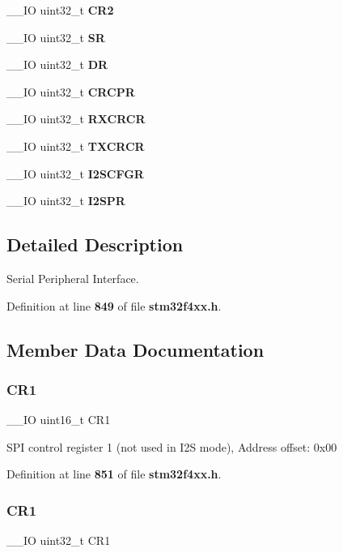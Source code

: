 \begin{DoxyCompactItemize}
\item 
\+\_\+\+\_\+\+IO uint32\+\_\+t \textbf{ C\+R2}
\item 
\+\_\+\+\_\+\+IO uint32\+\_\+t \textbf{ SR}
\item 
\+\_\+\+\_\+\+IO uint32\+\_\+t \textbf{ DR}
\item 
\+\_\+\+\_\+\+IO uint32\+\_\+t \textbf{ C\+R\+C\+PR}
\item 
\+\_\+\+\_\+\+IO uint32\+\_\+t \textbf{ R\+X\+C\+R\+CR}
\item 
\+\_\+\+\_\+\+IO uint32\+\_\+t \textbf{ T\+X\+C\+R\+CR}
\item 
\+\_\+\+\_\+\+IO uint32\+\_\+t \textbf{ I2\+S\+C\+F\+GR}
\item 
\+\_\+\+\_\+\+IO uint32\+\_\+t \textbf{ I2\+S\+PR}
\end{DoxyCompactItemize}


\subsection{Detailed Description}
Serial Peripheral Interface. 

Definition at line \textbf{ 849} of file \textbf{ stm32f4xx.\+h}.



\subsection{Member Data Documentation}
\mbox{\label{structSPI__TypeDef_a61400ce239355b62aa25c95fcc18a5e1}} 
\subsubsection{C\+R1\hspace{0.1cm}{\footnotesize\ttfamily [1/2]}}
{\footnotesize\ttfamily \+\_\+\+\_\+\+IO uint16\+\_\+t C\+R1}

S\+PI control register 1 (not used in I2S mode), Address offset\+: 0x00 

Definition at line \textbf{ 851} of file \textbf{ stm32f4xx.\+h}.

\mbox{\label{structSPI__TypeDef_ab0ec7102960640751d44e92ddac994f0}} 
\subsubsection{C\+R1\hspace{0.1cm}{\footnotesize\ttfamily [2/2]}}
{\footnotesize\ttfamily \+\_\+\+\_\+\+IO uint32\+\_\+t C\+R1}

